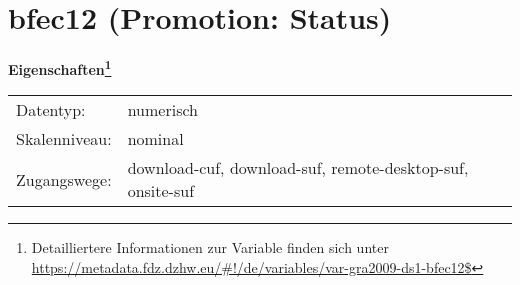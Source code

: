 
    \setcounter{footnote}{0}

    \vspace*{-1.8cm}
	\section{bfec12 (Promotion: Status)}
	\label{section:bfec12}



    \vspace*{0.5cm}
    \noindent\textbf{Eigenschaften\footnote{Detailliertere Informationen zur Variable finden sich unter
		\url{https://metadata.fdz.dzhw.eu/\#!/de/variables/var-gra2009-ds1-bfec12$}}}\\
	\begin{tabularx}{\hsize}{@{}lX}
	Datentyp: & numerisch \\
	Skalenniveau: & nominal \\
	Zugangswege: &
	  download-cuf, 
	  download-suf, 
	  remote-desktop-suf, 
	  onsite-suf
 \\
    \end{tabularx}



